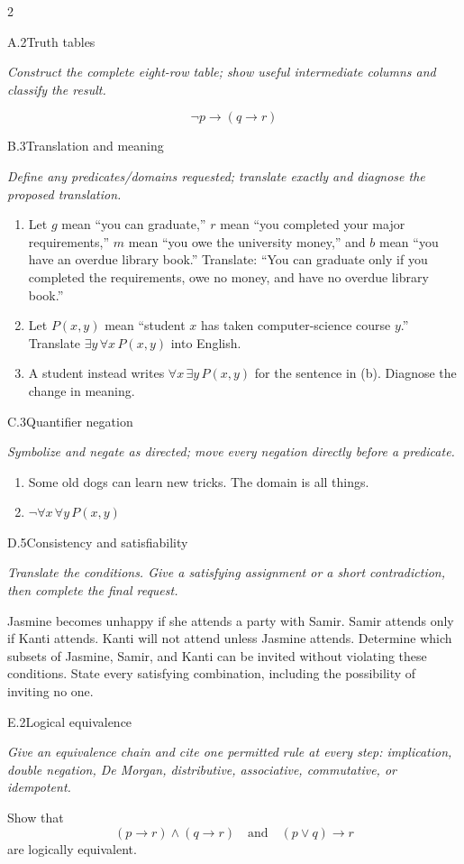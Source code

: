 \documentclass[9pt]{extarticle}
\begin{document}
\begin{multicols}{2}
\begin{CoreProblem}{A.2}{Truth tables}
{\scriptsize\textit{Construct the complete eight-row table; show useful intermediate columns and classify the result.}\par}
\[
  \neg p\to(q\to r)
\]
\end{CoreProblem}
\begin{CoreProblem}{B.3}{Translation and meaning}
{\scriptsize\textit{Define any predicates/domains requested; translate exactly and diagnose the proposed translation.}\par}
\begin{enumerate}[label=(\alph*)]
  \item Let $g$ mean ``you can graduate,'' $r$ mean ``you completed your major
        requirements,'' $m$ mean ``you owe the university money,'' and $b$
        mean ``you have an overdue library book.'' Translate: ``You can
        graduate only if you completed the requirements, owe no money, and
        have no overdue library book.''
  \item Let $P(x,y)$ mean ``student $x$ has taken computer-science course
        $y$.'' Translate $\exists y\,\forall x\,P(x,y)$ into English.
  \item A student instead writes $\forall x\,\exists y\,P(x,y)$ for the
        sentence in (b). Diagnose the change in meaning.
\end{enumerate}
\end{CoreProblem}
\begin{CoreProblem}{C.3}{Quantifier negation}
{\scriptsize\textit{Symbolize and negate as directed; move every negation directly before a predicate.}\par}
\begin{enumerate}[label=(\alph*)]
  \item Some old dogs can learn new tricks. The domain is all things.
  \item $\neg\forall x\,\forall y\,P(x,y)$
\end{enumerate}
\end{CoreProblem}
\columnbreak
\begin{CoreProblem}{D.5}{Consistency and satisfiability}
{\scriptsize\textit{Translate the conditions. Give a satisfying assignment or a short contradiction, then complete the final request.}\par}
Jasmine becomes unhappy if she attends a party with Samir. Samir attends only
if Kanti attends. Kanti will not attend unless Jasmine attends. Determine which
subsets of Jasmine, Samir, and Kanti can be invited without violating these
conditions. State every satisfying combination, including the possibility of
inviting no one.
\end{CoreProblem}
\begin{CoreProblem}{E.2}{Logical equivalence}
{\scriptsize\textit{Give an equivalence chain and cite one permitted rule at every step: implication, double negation, De Morgan, distributive, associative, commutative, or idempotent.}\par}
Show that
\[
  (p\to r)\land(q\to r)
  \quad\text{and}\quad
  (p\lor q)\to r
\]
are logically equivalent.
\end{CoreProblem}
\end{multicols}
\end{document}
